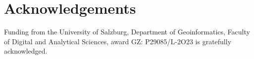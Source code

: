 \documentclass[final,5p,times,twocolumn]{elsarticle}
\begin{document}
\section{Acknowledgements}
Funding from the University of Salzburg, Department of Geoinformatics, Faculty of Digital and Analytical Sciences, award GZ: P29085/L-2O23 is gratefully acknowledged.

\appendix



% 



\end{document}
